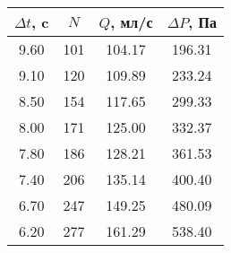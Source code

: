 \begin{tabular}{c|c|c|c}
\toprule
$\Delta t$, c & $N$ & $Q$, мл/с & $\Delta P$, Па \\
\midrule
9.60 & 101 & 104.17 & 196.31 \\
9.10 & 120 & 109.89 & 233.24 \\
8.50 & 154 & 117.65 & 299.33 \\
8.00 & 171 & 125.00 & 332.37 \\
7.80 & 186 & 128.21 & 361.53 \\
7.40 & 206 & 135.14 & 400.40 \\
6.70 & 247 & 149.25 & 480.09 \\
6.20 & 277 & 161.29 & 538.40 \\
\bottomrule
\end{tabular}
